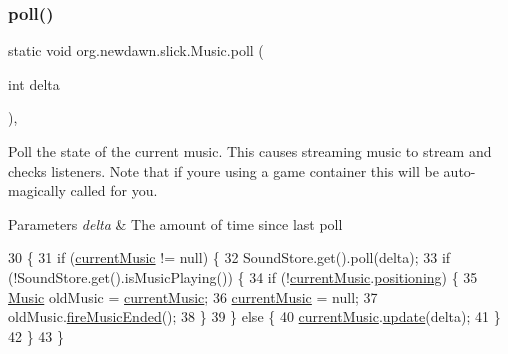 \subsubsection{\texorpdfstring{poll()}{poll()}}
{\footnotesize\ttfamily static void org.\+newdawn.\+slick.\+Music.\+poll (\begin{DoxyParamCaption}\item[{int}]{delta }\end{DoxyParamCaption})\hspace{0.3cm}{\ttfamily [inline]}, {\ttfamily [static]}}

Poll the state of the current music. This causes streaming music to stream and checks listeners. Note that if you\textquotesingle{}re using a game container this will be auto-\/magically called for you.


\begin{DoxyParams}{Parameters}
{\em delta} & The amount of time since last poll \\
\hline
\end{DoxyParams}

\begin{DoxyCode}
30                                        \{
31         \textcolor{keywordflow}{if} (\mbox{\hyperlink{classorg_1_1newdawn_1_1slick_1_1_music_a74d1b5592170c007631f4d3b7789dbbf}{currentMusic}} != null) \{
32             SoundStore.get().poll(delta);
33             \textcolor{keywordflow}{if} (!SoundStore.get().isMusicPlaying()) \{
34                 \textcolor{keywordflow}{if} (!\mbox{\hyperlink{classorg_1_1newdawn_1_1slick_1_1_music_a74d1b5592170c007631f4d3b7789dbbf}{currentMusic}}.\mbox{\hyperlink{classorg_1_1newdawn_1_1slick_1_1_music_a5b37d26c143b07b08eac2b3d79f940b9}{positioning}}) \{
35                     \mbox{\hyperlink{classorg_1_1newdawn_1_1slick_1_1_music_a6a8d9426a6c0070efcd19ba03d218a89}{Music}} oldMusic = \mbox{\hyperlink{classorg_1_1newdawn_1_1slick_1_1_music_a74d1b5592170c007631f4d3b7789dbbf}{currentMusic}};
36                     \mbox{\hyperlink{classorg_1_1newdawn_1_1slick_1_1_music_a74d1b5592170c007631f4d3b7789dbbf}{currentMusic}} = null;
37                     oldMusic.\mbox{\hyperlink{classorg_1_1newdawn_1_1slick_1_1_music_af35afdd15c12852bb797b5661e7f46b6}{fireMusicEnded}}();
38                 \}
39             \} \textcolor{keywordflow}{else} \{
40                 \mbox{\hyperlink{classorg_1_1newdawn_1_1slick_1_1_music_a74d1b5592170c007631f4d3b7789dbbf}{currentMusic}}.\mbox{\hyperlink{classorg_1_1newdawn_1_1slick_1_1_music_a93a114f3bdb3751b6df3650e5993cf13}{update}}(delta);
41             \}
42         \}
43     \}
\end{DoxyCode}
\mbox{\label{classorg_1_1newdawn_1_1slick_1_1_music_a30daef9a8ca722cd5adc80252e332c47}} 

